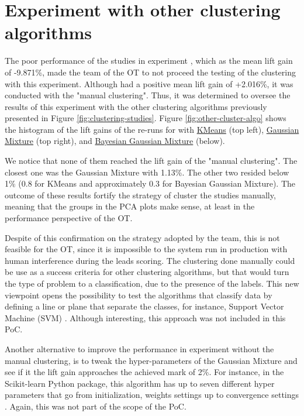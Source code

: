 \section{Experiment \nameExperimentII{} with other clustering algorithms}

The poor performance of the studies in experiment \nameExperimentI{}, which as the mean lift gain of -9.871\%, made the team of the OT to not proceed the testing of the clustering with this experiment. Although \nameExperimentII{} had a positive mean lift gain of +2.016\%, it was conducted with the "manual clustering". Thus, it was determined to oversee the results of this experiment with the other clustering algorithms previously presented in Figure \ref{fig:clustering-studies}. Figure \ref{fig:other-cluster-algo} shows the histogram of the lift gains of the re-runs for \nameExperimentII{} with \underline{KMeans} (top left), \underline{Gaussian Mixture} (top right), and \underline{Bayesian Gaussian Mixture} (below).

We notice that none of them reached the lift gain of the "manual clustering". The closest one was the Gaussian Mixture with 1.13\%. The other two resided below 1\% (0.8 for KMeans and approximately 0.3 for Bayesian Gaussian Mixture). The outcome of these results fortify the strategy of cluster the studies manually, meaning that the groups in the PCA plots make sense, at least in the performance perspective of the OT. 

Despite of this confirmation on the strategy adopted by the team, this is not feasible for the OT, since it is impossible to the system run in production with human interference during the leads scoring. The clustering done manually could be use as a success criteria for other clustering algorithms, but that would turn the type of problem to a classification, due to the presence of the labels. This new viewpoint opens the possibility to test the algorithms that classify data by defining a line or plane that separate the classes, for instance, Support Vector Machine (SVM) \cite{suykens1999least}. Although interesting, this approach was not included in this PoC.

Another alternative to improve the performance in experiment \nameExperimentII{} without the manual clustering, is to tweak the hyper-parameters of the Gaussian Mixture and see if it the lift gain approaches the achieved mark of 2\%. For instance, in the Scikit-learn Python package, this algorithm has up to seven different hyper parameters that go from initialization, weights settings up to convergence settings \cite{scikit-learn}. Again, this was not part of the scope of the PoC.

